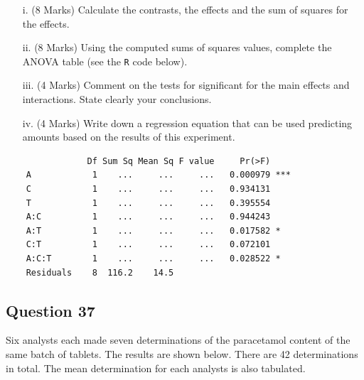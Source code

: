 \documentclass[a4paper,12pt]{article}
\begin{document}
\newpage


\begin{itemize}
	\item[i.] (8 Marks) Calculate the contrasts, the effects and the sum of squares for the effects.
	\item[ii.] (8 Marks) Using the computed sums of squares values, complete the ANOVA table (see the \texttt{R} code below).
	\item[iii.] (4 Marks) Comment on the tests for significant for the main effects and interactions. State clearly your conclusions.
	\item[iv.] (4 Marks) Write down a  regression equation that can be used predicting amounts based on the results of this experiment.
\end{itemize}

\begin{framed}
	\begin{verbatim}
	            Df Sum Sq Mean Sq F value     Pr(>F)    
	A            1    ...     ...     ...   0.000979 ***
	C            1    ...     ...     ...   0.934131    
	T            1    ...     ...     ...   0.395554 
	A:C          1    ...     ...     ...   0.944243    
	A:T          1    ...     ...     ...   0.017582 *
	C:T          1    ...     ...     ...   0.072101
	A:C:T        1    ...     ...     ...   0.028522 *    
	Residuals    8  116.2    14.5                      
	\end{verbatim}
\end{framed}


\newpage

\subsection*{Question 37} Six analysts each made seven determinations of the paracetamol content of the same batch of tablets.
The results are shown below. There are 42 determinations in total. The mean determination for each analysts is also tabulated. \\
\end{document}
